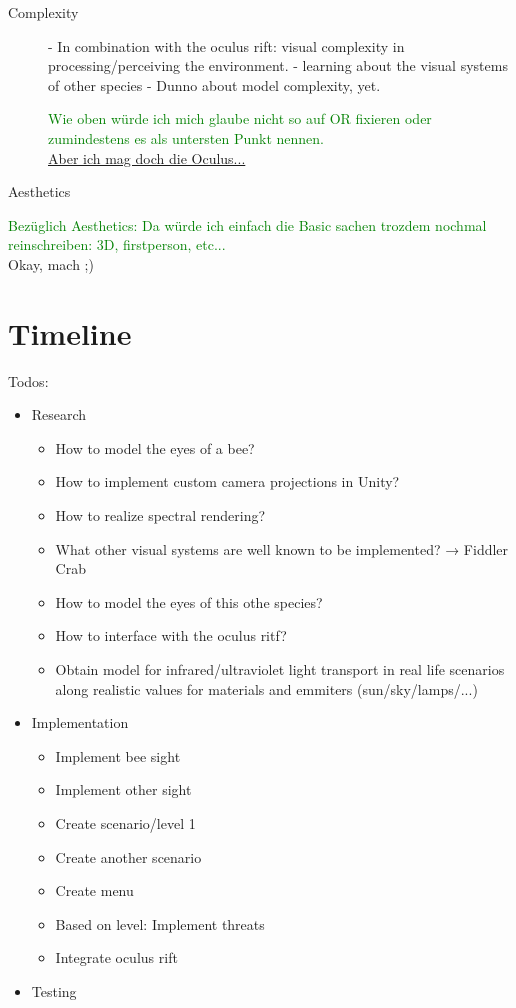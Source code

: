\documentclass{acm_proc_article-sp}
\newcommand{\sebastian}[1]{\textcolor{Green}{#1}}
\newcommand{\stefan}[1]{\textcolor{BurntOrange}{#1}}
\begin{document}
\begin{description}
\item[Complexity]
- In combination with the oculus rift: visual complexity in
  processing/perceiving the environment.
- learning about the visual systems of other species
- Dunno about model complexity, yet.

\sebastian{Wie oben würde ich mich glaube nicht so auf OR fixieren oder
zumindestens es als untersten Punkt nennen.}\\
\stefan{\href{https://www.youtube.com/watch?v=F54ME85o_aQ}
{Aber ich mag doch die Oculus...}}


\item[Aesthetics]
\end{description}

\sebastian{Bezüglich Aesthetics: Da würde ich einfach die Basic sachen trozdem
nochmal reinschreiben: 3D, firstperson, etc...}\\
\stefan{Okay, mach ;)}


\section{Timeline}

Todos:
\begin{itemize}
  \item Research
  \begin{itemize}
    \item How to model the eyes of a bee?
    \item How to implement custom camera projections in Unity?
    \item How to realize spectral rendering?
    \item What other visual systems are well known to be implemented? → Fiddler Crab
    \item How to model the eyes of this othe species?
    \item How to interface with the oculus ritf?
    \item Obtain model for infrared/ultraviolet light transport in real life
          scenarios along realistic values for materials and emmiters (sun/sky/lamps/...)
  \end{itemize}
  \item Implementation
  \begin{itemize}
    \item Implement bee sight
    \item Implement other sight
    \item Create scenario/level 1
    \item Create another scenario
    \item Create menu
    \item Based on level: Implement threats
    \item Integrate oculus rift
  \end{itemize}
  \item Testing
\end{itemize}
\end{document}
